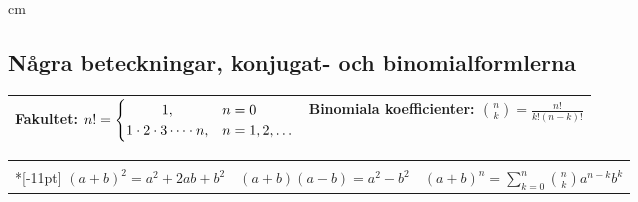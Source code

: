 \documentclass{article}
\begin{document}

\lfoot{\ifnum\thepage=1\small\today\fi}
\cfoot{}
 cm
\normalsize



\let\iff\Leftrightarrow %
\let\ob\overline        %
\newcommand\Rone{\mathbb{R}}
\def\EndRow{\\*[3pt]}


\vspace{-1.5cm} 

\subsection*{Några beteckningar, konjugat- och binomialformlerna}%


\begin{tabular}[m]{|c|c|}
  \hline
Fakultet: $n! = \begin{cases}
                \hfil1,& n=0\\
                1\cdot2\cdot3\cdots\cdot n,& n=1,2,\dots
                \end{cases}$
&
Binomiala koefficienter:
    $\binom nk = \frac{n!}{k!(n-k)!}$\\
  \hline
\end{tabular}

\medskip

\begin{tabular}[m]{|c|c|c|}
      \hline
      &&\\*[-11pt]
    $(a + b)^2 = a^2 + 2ab+b^2$
    &
    $(a+b)(a-b) = a^2-b^2$
    &
    $(a+b)^n = 
    \sum_{k=0}^n\binom nk a^{n-k}b^k$\\
      \hline
\end{tabular}
% 
\end{document}
